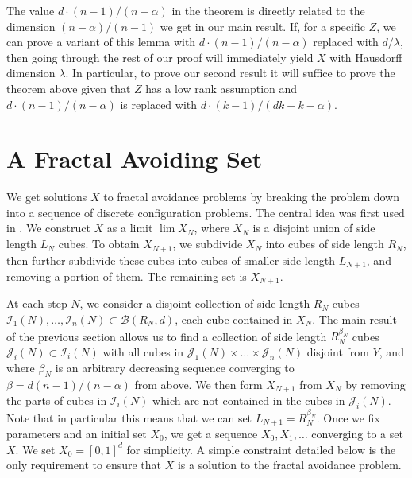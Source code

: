 \documentclass{article}
\theoremstyle{plain}
\theoremstyle{plain}
\begin{document}
\begin{multicols}{2}
The value $d \cdot (n-1)/(n-\alpha)$ in the theorem is directly related to the dimension $(n-\alpha)/(n-1)$ we get in our main result. If, for a specific $Z$, we can prove a variant of this lemma with $d \cdot (n-1)/(n-\alpha)$ replaced with $d/\lambda$, then going through the rest of our proof will immediately yield $X$ with Hausdorff dimension $\lambda$. In particular, to prove our second result it will suffice to prove the theorem above given that $Z$ has a low rank assumption and $d \cdot (n-1)/(n-\alpha)$ is replaced with $d \cdot (k-1)/(dk - k - \alpha)$.


\section{A Fractal Avoiding Set}

We get solutions $X$ to fractal avoidance problems by breaking the problem down into a sequence of discrete configuration problems. The central idea was first used in \cite{MalabikaRob}. We construct $X$ as a limit $\lim X_N$, where $X_N$ is a disjoint union of side length $L_N$ cubes. To obtain $X_{N+1}$, we subdivide $X_N$ into cubes of side length $R_N$, then further subdivide these cubes into cubes of smaller side length $L_{N+1}$, and removing a portion of them. The remaining set is $X_{N+1}$.

At each step $N$, we consider a disjoint collection of side length $R_N$ cubes $\mathcal{I}_1(N), \dots, \mathcal{I}_n(N) \subset \mathcal{B}(R_N,d)$, each cube contained in $X_N$. The main result of the previous section allows us to find a collection of side length $R_N^{\beta_N}$ cubes $\mathcal{J}_i(N) \subset \mathcal{I}_i(N)$ with all cubes in $\mathcal{J}_1(N) \times \dots \times \mathcal{J}_n(N)$ disjoint from $Y$, and where $\beta_N$ is an arbitrary decreasing sequence converging to $\beta = d(n-1)/(n-\alpha)$ from above. We then form $X_{N+1}$ from $X_N$ by removing the parts of cubes in $\mathcal{I}_i(N)$ which are not contained in the cubes in $\mathcal{J}_i(N)$. Note that in particular this means that we can set $L_{N+1} = R_N^{\beta_N}$. Once we fix parameters and an initial set $X_0$, we get a sequence $X_0, X_1, \dots$ converging to a set $X$. We set $X_0 = [0,1]^d$ for simplicity. A simple constraint detailed below is the only requirement to ensure that $X$ is a solution to the fractal avoidance problem.


\end{multicols}
\end{document}
